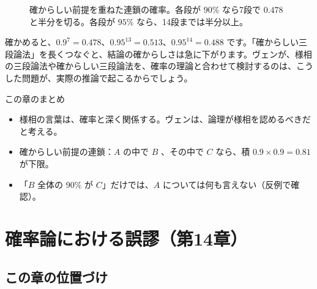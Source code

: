\documentclass[a4paper,11pt,openany]{ltjsbook}
\begin{document}
\begin{figure}[htbp]
\centering
{}
\caption{確からしい前提を重ねた連鎖の確率。各段が $90\%$ なら7段で $0.478$ と半分を切る。各段が $95\%$ なら、14段までは半分以上。}
\end{figure}

確かめると、$0.9^7=0.478$、$0.95^{13}=0.513$、$0.95^{14}=0.488$ です。「確からしい三段論法」を長くつなぐと、結論の確からしさは急に下がります。ヴェンが、様相の三段論法や確からしい三段論法を、確率の理論と合わせて検討するのは、こうした問題が、実際の推論で起こるからでしょう。

\begin{pointbox}{この章のまとめ}
\begin{itemize}[leftmargin=*]
\item 様相の言葉は、確率と深く関係する。ヴェンは、論理が様相を認めるべきだと考える。
\item 確からしい前提の連鎖：$A$ の中で $B$ 、その中で $C$ なら、積 $0.9\times0.9=0.81$ が下限。
\item 「$B$ 全体の $90\%$ が $C$」だけでは、$A$ については何も言えない（反例で確認）。
\end{itemize}
\end{pointbox}

\chapter{確率論における誤謬（第14章）}

\section{この章の位置づけ}
\end{document}
